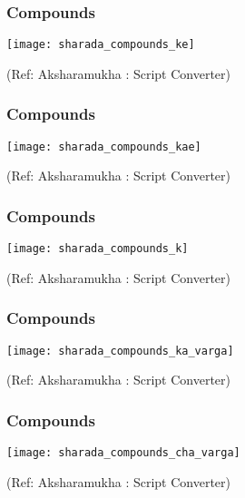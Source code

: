 \begin{frame}[fragile]\frametitle{Compounds}

	\begin{center}
	\texttt{[image: sharada\_compounds\_ke]} 
	
	{\tiny (Ref: Aksharamukha : Script Converter)}
	\end{center}	

\end{frame}

\begin{frame}[fragile]\frametitle{Compounds}

	\begin{center}
	\texttt{[image: sharada\_compounds\_kae]} 
	
	{\tiny (Ref: Aksharamukha : Script Converter)}
	\end{center}	

\end{frame}

\begin{frame}[fragile]\frametitle{Compounds}

	\begin{center}
	\texttt{[image: sharada\_compounds\_k]} 
	
	{\tiny (Ref: Aksharamukha : Script Converter)}
	\end{center}	

\end{frame}

\begin{frame}[fragile]\frametitle{Compounds}

	\begin{center}
	\texttt{[image: sharada\_compounds\_ka\_varga]} 
	
	{\tiny (Ref: Aksharamukha : Script Converter)}
	\end{center}	

\end{frame}

\begin{frame}[fragile]\frametitle{Compounds}

	\begin{center}
	\texttt{[image: sharada\_compounds\_cha\_varga]} 
	
	{\tiny (Ref: Aksharamukha : Script Converter)}
	\end{center}	

\end{frame}

